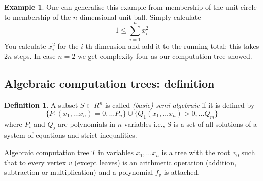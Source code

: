\documentclass{article}
\theoremstyle{definition}
\newtheorem{definition}{Definition}[section]
\newtheorem{example}{Example}[section]
\begin{document}
\begin{center}
\end{center}

\begin{example}
    One can generalise this example from membership of the unit circle to membership
    of the $n$ dimensional unit ball.
    Simply calculate
    $$1 \leq \sum_{i=1}^{n} x_i^2$$
    You calculate $x_i^2$ for the $i$-th dimension and add it to the running total;
    this takes $2n$ steps.
    In case $n = 2$ we get complexity four as our computation tree showed.
\end{example}

\subsection{Algebraic computation trees: definition}
\begin{definition}
    A subset $S \subset R^n$ is called \textit{(basic) semi-algebraic} if it is defined by
    $$\{P_1(x_1,\dots x_n) = 0,\dots P_n\}
    \cup
    \{Q_1(x_1,\dots x_n) > 0,\dots Q_m\}$$
    where $P_i$ and $Q_j$ are polynomials in $n$ variables
    i.e., S is a set of all solutions of a system of equations and strict inequalities.
\end{definition}

Algebraic computation tree $T$ in variables $x_1,\dots x_n$
is a tree with the root $v_0$ such that to every vertex $v$ (except leaves)
is an arithmetic operation (addition, subtraction or multiplication) 
and a polynomial $f_v$ is attached.
\end{document}
